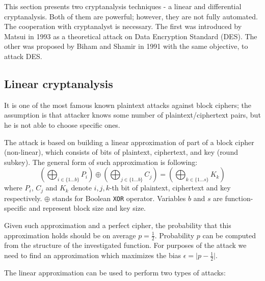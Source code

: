 \documentclass[
    digital,    %
    oneside,    %
    color,
    11pt,
    nocover,
    notable,
    nolof,
    nolot,
    final
]{fithesis3}
\renewcommand\_{\textunderscore\allowbreak}
\begin{document}
This section presents two cryptanalysis techniques - a linear and differential cryptanalysis. Both of them are powerful; however, they are not fully automated. The cooperation with cryptanalyst is necessary. The first was introduced by Matsui \cite{matsui1993linear} in 1993 as a theoretical attack on Data Encryption Standard (DES). The other was proposed by Biham and Shamir \cite{Biham1991} in 1991 with the same objective, to attack DES.


\subsection{Linear cryptanalysis}

It is one of the most famous known plaintext attacks against block ciphers; the assumption is that attacker knows some number of plaintext/ciphertext pairs, but he is not able to choose specific ones. 

The attack is based on building a linear approximation of part of a block cipher (non-linear), which consists of bits of plaintext, ciphertext, and key (round subkey). The general form of such approximation is following: 
\begin{equation}
\left( \bigoplus_{i \in \{1...b\}} P_{i} \right) \oplus \left( \bigoplus_{j \in \{1...b\}} C_{j} \right) = \left( \bigoplus_{k \in \{1...s\}} K_{k} \right)
\label{eq:general_approx}
\end{equation}
where $P_{i}$, $C_{j}$ and $K_{k}$ denote $i,j,k$-th bit of plaintext, ciphertext and key respectively. $\oplus$ stands for Boolean \texttt{XOR} operator. Variables $b$ and $s$ are function-specific and represent block size and key size. \cite{junod2000linear} 

Given such approximation and a perfect cipher, the probability that this approximation holds should be on average $p = \frac{1}{2}$. Probability $p$ can be computed from the structure of the investigated function. For purposes of the attack we need to find an approximation which maximizes the bias $\epsilon = \lvert p - \frac{1}{2} \rvert$. 

The linear approximation can be used to perform two types of attacks:
\end{document}
